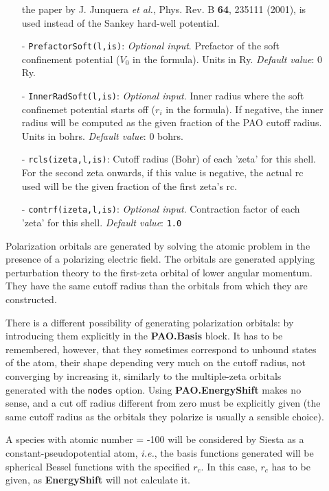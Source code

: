 \documentclass[11pt]{article}
\begin{document}
\begin{description}
\begin{itemize}
the paper by J. Junquera {\it et al.}, Phys. Rev. B {\bf 64}, 235111 (2001),
is used instead of the Sankey hard-well potential.
\item[-] {\tt PrefactorSoft(l,is)}: {\it Optional input}. Prefactor
of the soft confinement potential ($V_{0}$ in the formula). Units in Ry. 
{\it Default value}: 0 Ry.
\item[-] {\tt InnerRadSoft(l,is)}: {\it Optional input}. Inner radius where
the soft confinemet potential starts off ($r_{i}$ in the formula). 
If negative, the inner radius will be computed as the given fraction
of the PAO cutoff radius.
Units in bohrs. {\it Default value}: 0 bohrs. 
\item[-] {\tt rcls(izeta,l,is)}: Cutoff radius (Bohr) of 
each 'zeta' for this shell. For the second zeta onwards, if this value
is negative, the actual rc used will be the given fraction of the
first zeta's rc. 
\item[-] {\tt contrf(izeta,l,is)}: {\it Optional input}. 
Contraction factor of 
each 'zeta' for this shell.
{\it Default value}: {\tt 1.0}
\end{itemize} 

Polarization orbitals are generated by solving the
atomic problem in the presence of a polarizing electric field. The
orbitals are generated applying perturbation theory to the first-zeta
orbital of lower angular momentum.  They have the same cutoff radius
than the orbitals from which they are constructed.

There is a different possibility of generating polarization orbitals:
by introducing them explicitly in the {\bf PAO.Basis} block.
It has to be remembered, however, that they sometimes correspond to 
unbound states of the atom, their shape depending very much on the
cutoff radius, not converging by increasing it, similarly to the
multiple-zeta orbitals generated with the {\tt nodes} option. 
Using {\bf PAO.EnergyShift} makes no sense, and a cut off 
radius different from zero must be explicitly given (the same cutoff radius
as the orbitals they polarize is usually a sensible choice).

A species with atomic number = -100 will be considered by {\sc Siesta} as
a constant-pseudopotential atom, {\it i.e.}, the basis functions
generated will be spherical Bessel functions
with the specified $r_c$. In this case, $r_c$ has to be given, as
{\bf EnergyShift} will not calculate it.


\end{description}
\end{document}
